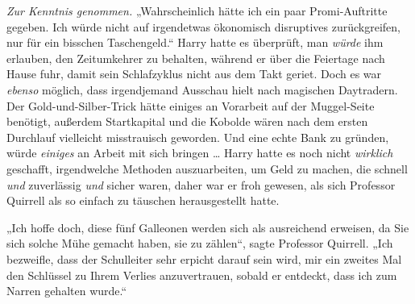 \emph{Zur Kenntnis genommen.}
„Wahrscheinlich hätte ich ein paar Promi-Auftritte gegeben. Ich würde nicht auf irgendetwas ökonomisch disruptives zurückgreifen, nur für ein bisschen Taschengeld.“ Harry hatte es überprüft, man \emph{würde} ihm erlauben, den Zeitumkehrer zu behalten, während er über die Feiertage nach Hause fuhr, damit sein Schlafzyklus nicht aus dem Takt geriet. Doch es war \emph{ebenso} möglich, dass irgendjemand Ausschau hielt nach magischen Daytradern.%
Der Gold-und-Silber-Trick hätte einiges an Vorarbeit auf der Muggel-Seite benötigt, außerdem Startkapital und die Kobolde wären nach dem ersten Durchlauf vielleicht misstrauisch geworden. Und eine echte Bank zu gründen, würde \emph{einiges} an Arbeit mit sich bringen … Harry hatte es noch nicht \emph{wirklich} geschafft, irgendwelche Methoden auszuarbeiten, um Geld zu machen, die schnell \emph{und} zuverlässig \emph{und} sicher waren, daher war er froh gewesen, als sich Professor Quirrell als so einfach zu täuschen herausgestellt hatte.

„Ich hoffe doch, diese fünf Galleonen werden sich als ausreichend erweisen, da Sie sich solche Mühe gemacht haben, sie zu zählen“, sagte Professor Quirrell.
„Ich bezweifle, dass der Schulleiter sehr erpicht darauf sein wird, mir ein zweites Mal den Schlüssel zu Ihrem Verlies anzuvertrauen, sobald er entdeckt, dass ich zum Narren gehalten wurde.“

